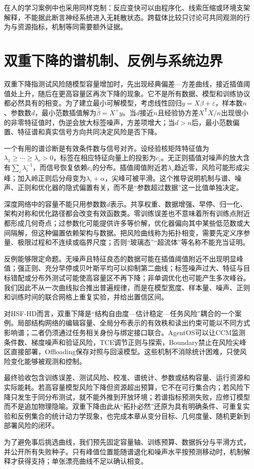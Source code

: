 在人的学习案例中也采用同样克制：反应变快可以由程序化、线索压缩或环境支架解释，不能据此断言神经系统进入无耗散状态。跨载体比较只讨论可共同观测的行为与资源指标，机制等同需要额外证据。

\section{双重下降的谱机制、反例与系统边界}
\label{sec:double_descent_topology}

双重下降指测试风险随模型容量增加时，先出现经典偏差—方差曲线，接近插值阈值处上升，随后在更高容量区再次下降的现象。它不是所有数据、模型和训练协议都必然具有的相变。为了建立最小可解模型，考虑线性回归$y=X\beta+\varepsilon$，样本数$n$、参数数$d$，最小范数插值解为$\widehat\beta=X^+y$。当$d$接近$n$且经验协方差$X^{\mathsf T}X/n$出现很小的非零特征值时，伪逆会放大标签噪声，方差项增大；当$d>n$后，最小范数偏置、特征谱和真实信号方向共同决定风险是否下降。

一个有用的谱诊断是有效条件数与信号对齐。设经验核矩阵特征值为$\lambda_1\geq\cdots\geq\lambda_r>0$，标签在相应特征向量上的投影为$c_i$。无正则插值对噪声的放大含有$\sum_i\lambda_i^{-1}$，而信号恢复依赖$c_i$的分布。插值阈值附近若$\lambda_r$趋近零，风险可能形成尖峰；加入岭正则后分母变为$\lambda_i+\alpha$，尖峰可被平滑。这个推导说明机制与谱、噪声、正则和优化器的隐式偏置有关，而不是“参数超过数据”这一比值单独决定。

深度网络中的容量不能只用参数数$d$表示。共享权重、数据增强、早停、归一化、架构对称和优化路径都会改变有效函数类。零训练误差也不意味着所有训练点附近都形成几何奇点；过参数化可能提供许多等价解，优化器偏向其中某些低范数或大间隔解，但这种偏置依赖架构与数据。把风险曲线称为拓扑相变，需要先定义序参量、极限过程和不连续或临界尺度；否则“玻璃态”“超流体”等名称不能充当证明。

反例能够限定命题。无噪声且特征良态的数据可能在插值阈值附近不出现明显峰值；强正则、充分早停或贝叶斯平均可以抑制第二曲线；标签噪声过大、特征与目标错配或分布外测试可能使高容量区不再下降；非单调优化也可能产生多次峰谷。我们因此不从一次曲线拟合推出普遍规律，而是在模型宽度、样本量、噪声、正则和训练时间的联合网格上重复实验，并给出置信区间。

对HSF-HD而言，双重下降是“结构自由度—估计稳定—任务风险”耦合的一个案例。局部结构网络的编辑容量、全局分布表示的有效秩和读出约束可能以不同方式影响谱；二者仍须通过任务相关身份与绑定接口联合。AgentOS可以让CCM监测条件数、梯度噪声和验证风险，TCE调节正则与探索，Boundary禁止在风险尖峰区直接部署，Offloading保存对照与回滚模型。这些机制不消除统计困难，只使风险变化能够被观测和控制。

最终验收包含训练误差、测试风险、校准、谱统计、参数或结构容量、运行资源和实际能耗。若高容量模型风险下降但资源超出预算，它不在可行集合内；若风险下降只发生于同分布测试，就不能外推到开放环境；若谱指标预测失败，应修订模型而不是追加物理隐喻。双重下降由此从“拓扑必然”还原为具有明确条件、可重复实验和反例集合的统计动力学现象，也完成本章从变分目标、几何度量、随机更新到部署风险的闭环。

为了避免事后挑选曲线，我们预先固定容量轴、训练预算、数据拆分与平滑方式，并公开所有失败种子。只有峰值位置能随谱退化和噪声水平按预测移动时，机制解释才获得支持；单张漂亮曲线不足以确认相变。
